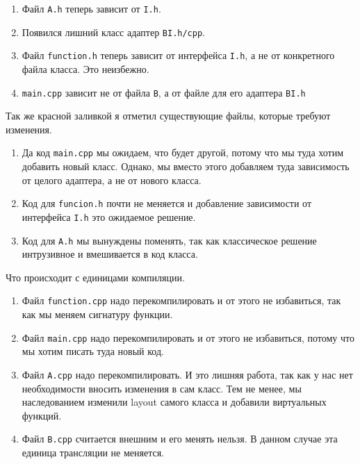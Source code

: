 {\begin{enumerate}
\item Файл \verb"A.h" теперь зависит от \verb"I.h".

\item Появился лишний класс адаптер \verb"BI.h/cpp".

\item Файл \verb"function.h" теперь зависит от интерфейса \verb"I.h", а не от конкретного файла класса.
Это неизбежно.

\item \verb"main.cpp" зависит не от файла \verb"B", а от файле для его адаптера \verb"BI.h"
\end{enumerate}
Так же красной заливкой я отметил существующие файлы, которые требуют изменения.
\begin{enumerate}
\item Да код \verb"main.cpp" мы ожидаем, что будет другой, потому что мы туда хотим добавить новый класс.
Однако, мы вместо этого добавляем туда зависимость от целого адаптера, а не от нового класса.

\item Код для \verb"funcion.h" почти не меняется и добавление зависимости от интерфейса \verb"I.h" это ожидаемое решение.

\item Код для \verb"A.h" мы вынуждены поменять, так как классическое решение интрузивное и вмешивается в код класса.
\end{enumerate}
Что происходит с единицами компиляции.
\begin{enumerate}
\item Файл \verb"function.cpp" надо перекомпилировать и от этого не избавиться, так как мы меняем сигнатуру функции.

\item Файл \verb"main.cpp" надо перекомпилировать и от этого не избавиться, потому что мы хотим писать туда новый код.

\item Файл \verb"A.cpp" надо перекомпилировать.
И это лишняя работа, так как у нас нет необходимости вносить изменения в сам класс.
Тем не менее, мы наследованием изменили layout самого класса и добавили виртуальных функций.

\item Файл \verb"B.cpp" считается внешним и его менять нельзя.
В данном случае эта единица трансляции не меняется.


\end{enumerate}}
